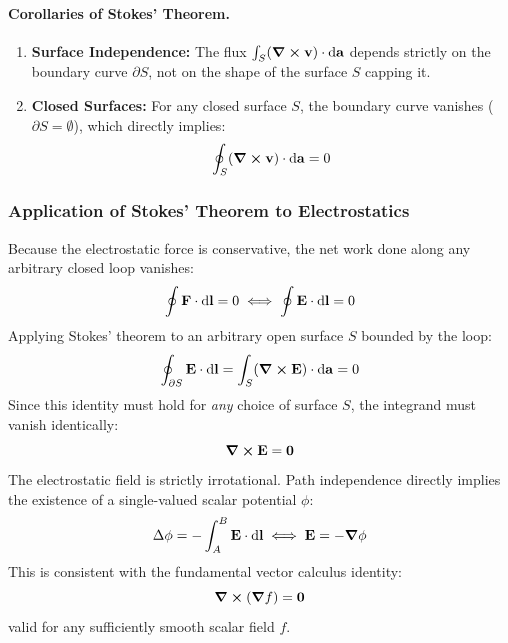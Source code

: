 \paragraph{Corollaries of Stokes' Theorem.}
\begin{enumerate}
    \item \textbf{Surface Independence:} The flux $\int_S (\curl\vb{v}) \cdot \dd{\vb{a}}$ depends strictly on the boundary curve $\partial S$, not on the shape of the surface $S$ capping it.
    \item \textbf{Closed Surfaces:} For any closed surface $S$, the boundary curve vanishes ($\partial S = \emptyset$), which directly implies:
    \begin{equation}
        \oint_S (\curl{\vb{v}}) \cdot \dd{\vb{a}} = 0
    \end{equation}
\end{enumerate}

\subsubsection{Application of Stokes' Theorem to Electrostatics}

Because the electrostatic force is conservative, the net work done along any arbitrary closed loop vanishes:
\begin{equation}
    \oint \vb{F} \cdot \dd{\vb{l}} = 0 \iff \oint \vb{E} \cdot \dd{\vb{l}} = 0
\end{equation}
Applying Stokes' theorem to an arbitrary open surface $S$ bounded by the loop:
\begin{equation}
    \oint_{\partial S} \vb{E} \cdot \dd{\vb{l}} = \int_S (\curl{\vb{E}}) \cdot \dd{\vb{a}} = 0
\end{equation}
Since this identity must hold for \emph{any} choice of surface $S$, the integrand must vanish identically:
\begin{equation}
    \curl{\vb{E}} = \vb{0}
\end{equation}
The electrostatic field is strictly irrotational. Path independence directly implies the existence of a single-valued scalar potential $\phi$:
\begin{equation}
    \Delta\phi = -\int_A^B \vb{E} \cdot \dd{\vb{l}} \iff \vb{E} = -\grad{\phi}
\end{equation}
This is consistent with the fundamental vector calculus identity:
\begin{equation}
    \curl(\grad f) = \vb{0}
\end{equation}
valid for any sufficiently smooth scalar field $f$.

